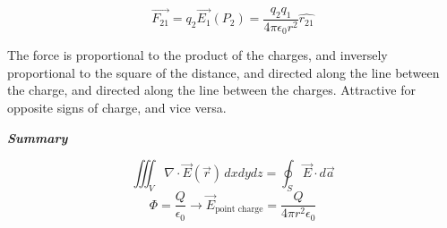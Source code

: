 \documentclass[svgnames]{article}   	%
\begin{document}

\begin{tcolorbox}[title = Coulomb's Law]
\[
  \vec{F_{21}} = q_2 \vec{E_1}(P_2) = \frac{q_2q_1}{4 \pi \epsilon_0 r^2}
  \hat{r_{21}}
\]
\end{tcolorbox}

The force is proportional to the product of the charges, and inversely
proportional to the square of the distance, and directed along the line between
the charge, and directed along the line between the charges. Attractive for
opposite signs of charge, and vice versa. 


\textit{ \textbf{Summary}} 

\vspace{5px} \[
  \iiint_V \nabla \cdot \vec{E} (\vec{r} ) \, dxdydz = \oint_S \vec{E} \cdot
  d\vec{a}
\] \vspace{5px}
\vspace{5px} \[
  \Phi = \frac{Q}{\epsilon_0} \rightarrow \vec{E}_{\text{point charge}}
  = \frac{Q}{4\pi r^2 \epsilon_0}
\] \vspace{5px}
\end{document}
